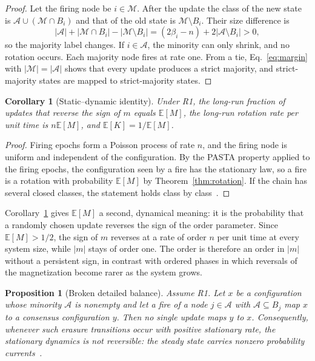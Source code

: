 \documentclass[aps,pre,reprint,superscriptaddress,amsmath,amssymb,longbibliography]{revtex4-2}
\newtheorem{proposition}{Proposition}
\newtheorem{corollary}{Corollary}
\theoremstyle{remark}
\newcommand{\E}{\mathbb{E}}
\begin{document}
\begin{proof}
Let the firing node be $i\in\mathcal M$. After the update the class of
the new state is $\mathcal A\cup(\mathcal M\cap B_i)$ and that of the old
state is $\mathcal M\setminus B_i$. Their size difference is
\begin{equation}
|\mathcal A|+|\mathcal M\cap B_i|-|\mathcal M\setminus B_i|
=(2\beta_i-n)+2|\mathcal A\setminus B_i|>0,
\label{eq:margin}
\end{equation}
so the majority label changes. If $i\in\mathcal A$, the minority can only
shrink, and no rotation occurs. Each majority node fires at rate one.
From a tie, Eq.~\eqref{eq:margin} with $|\mathcal M|=|\mathcal A|$ shows
that every update produces a strict majority, and strict-majority states
are mapped to strict-majority states.
\end{proof}

\begin{corollary}[Static--dynamic identity]
\label{cor:duality}
Under R1, the long-run fraction of updates that reverse the sign of $m$
equals $\E[M]$, the long-run rotation rate per unit time is
$n\E[M]$, and $\E[K]=1/\E[M]$.
\end{corollary}

\begin{proof}
Firing epochs form a Poisson process of rate $n$, and the firing node is
uniform and independent of the configuration. By the PASTA property
applied to the firing epochs, the configuration seen by a fire has the
stationary law, so a fire is a rotation with probability $\E[M]$ by
Theorem~\ref{thm:rotation}. If the chain has several closed classes, the
statement holds class by class~\cite{SM}.
\end{proof}

Corollary~\ref{cor:duality} gives $\E[M]$ a second, dynamical meaning:
it is the probability that a randomly chosen update reverses the sign of
the order parameter. Since $\E[M]>1/2$, the sign of $m$ reverses at a
rate of order $n$ per unit time at every system size, while $|m|$ stays
of order one. The order is therefore an order in $|m|$ without a
persistent sign, in contrast with ordered phases in which reversals of
the magnetization become rarer as the system grows.

\begin{proposition}[Broken detailed balance]
\label{prop:irrev}
Assume R1. Let $x$ be a configuration whose minority $\mathcal A$ is
nonempty and let a fire of a node $j\in\mathcal A$ with
$\mathcal A\subseteq B_j$ map $x$ to a consensus configuration $y$. Then
no single update maps $y$ to $x$. Consequently, whenever such erasure
transitions occur with positive stationary rate, the stationary
dynamics is not reversible: the steady state carries nonzero probability
currents~\cite{Schnakenberg1976}.
\end{proposition}
\end{document}
